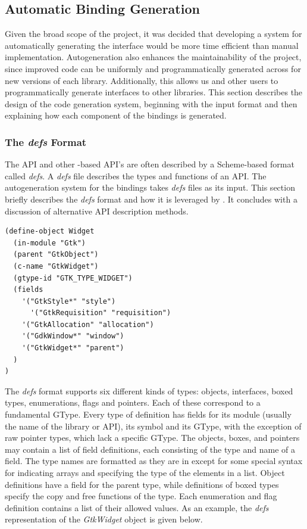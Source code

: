\documentclass[article]{jss}
\begin{document}
\subsection{Automatic Binding Generation}

Given the broad scope of the project, it was decided that developing a
system for automatically generating the interface would be more time
efficient than manual implementation. Autogeneration also enhances the
maintainability of the project, since improved code can be uniformly
and programmatically generated across for new versions of each
library. Additionally, this allows us and other users to
programmatically generate interfaces to other libraries. This section
describes the design of the code generation system, beginning with the
input format and then explaining how each component of the bindings is
generated.

\subsubsection[The defs Format]{The \emph{defs} Format}

The  API and other -based API's are often
described by
a Scheme-based format called \emph{defs}. A \emph{defs} file describes
the types
and functions of an API. The autogeneration system for the 
bindings
takes \emph{defs} files as its input. This section briefly describes
the 
\emph{defs} format and how it is leveraged by . It
concludes
with a discussion of alternative API description methods.

\begin{verbatim}
(define-object Widget
  (in-module "Gtk")
  (parent "GtkObject")
  (c-name "GtkWidget")
  (gtype-id "GTK_TYPE_WIDGET")
  (fields
    '("GtkStyle*" "style")
	  '("GtkRequisition" "requisition")
    '("GtkAllocation" "allocation")
    '("GdkWindow*" "window")
    '("GtkWidget*" "parent")
  )
)
\end{verbatim}

The \emph{defs} format supports six different kinds of types: objects,
interfaces, boxed types, enumerations, flags and pointers. Each of
these correspond to a fundamental GType. Every type of definition has
fields for its module (usually the name of the library or API), its
symbol and its GType, with the exception of raw pointer types, which
lack a specific GType. The objects, boxes, and pointers may contain a
list of field definitions, each consisting of the type and name of a
field. The type names are formatted as they are in  except
for some special syntax for indicating arrays and specifying the type
of the elements in a list. Object definitions have a field for the
parent type, while definitions of boxed types specify the copy and
free functions of the type.  Each enumeration and flag definition
contains a list of their allowed values.  As an example, the
\emph{defs} representation of the \emph{GtkWidget} object is given
below.
\end{document}
